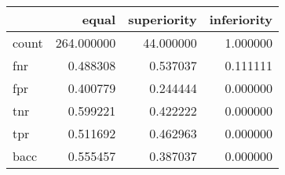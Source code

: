 \begin{tabular}{lrrr}
\toprule
{} &       equal &  superiority &  inferiority \\
\midrule
count &  264.000000 &    44.000000 &     1.000000 \\
fnr   &    0.488308 &     0.537037 &     0.111111 \\
fpr   &    0.400779 &     0.244444 &     0.000000 \\
tnr   &    0.599221 &     0.422222 &     0.000000 \\
tpr   &    0.511692 &     0.462963 &     0.000000 \\
bacc  &    0.555457 &     0.387037 &     0.000000 \\
\bottomrule
\end{tabular}
